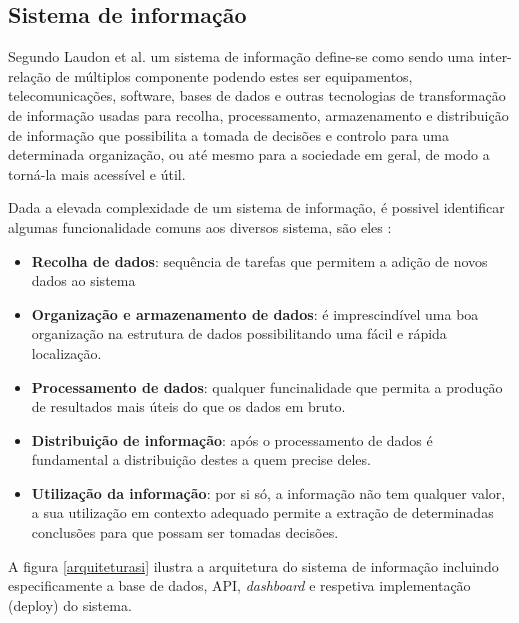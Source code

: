   
\subsection{Sistema de informação}


Segundo Laudon et al. \cite{Laudon1998}  um sistema de informação define-se como sendo uma inter-relação de múltiplos componente podendo estes ser equipamentos, telecomunicações, software, bases de dados e outras tecnologias de transformação de informação usadas para recolha, processamento, armazenamento e distribuição de informação que possibilita a tomada de decisões e controlo para uma determinada organização, ou até mesmo para a sociedade em geral, de modo a torná-la mais acessível e útil.

Dada a elevada complexidade de um sistema de informação, é possivel identificar algumas funcionalidade comuns aos diversos sistema, são eles \cite{Turban1996}: 

\begin{itemize}
	\item \textbf{Recolha de dados}: sequência de tarefas que permitem a adição de novos dados ao sistema
	\item \textbf{Organização e armazenamento de dados}: é imprescindível uma boa organização na estrutura de dados possibilitando uma fácil e rápida localização.
	\item \textbf{Processamento de dados}: qualquer funcinalidade que permita a produção de resultados mais úteis do que os dados em bruto. 
	 
	\item \textbf{Distribuição de informação}: após o processamento de dados é fundamental a distribuição destes a quem precise deles.
	
	\item \textbf{Utilização da informação}: por si só, a informação não tem qualquer valor, a sua utilização em contexto adequado permite a extração de determinadas conclusões para que possam ser tomadas decisões.
	
\end{itemize}



A figura \ref{arquiteturasi} ilustra a arquitetura do sistema de informação incluindo especificamente a base de dados, \ac{API}, \textit{dashboard} e respetiva implementação (deploy) do sistema. 


